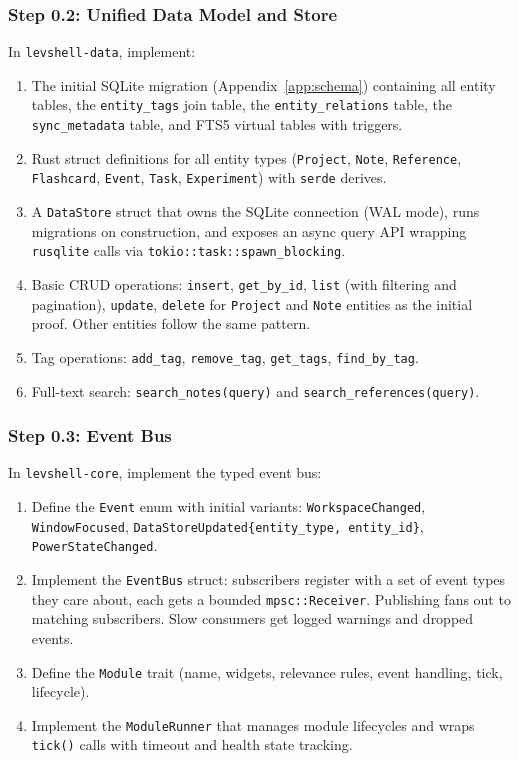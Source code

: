 \documentclass[11pt,a4paper]{article}
\begin{document}
\subsubsection{Step 0.2: Unified Data Model and Store}

In \texttt{levshell-data}, implement:

\begin{enumerate}[leftmargin=1.5em, itemsep=2pt]
  \item The initial SQLite migration (Appendix~\ref{app:schema}) containing all entity tables, the \texttt{entity\_tags} join table, the \texttt{entity\_relations} table, the \texttt{sync\_metadata} table, and FTS5 virtual tables with triggers.
  \item Rust struct definitions for all entity types (\texttt{Project}, \texttt{Note}, \texttt{Reference}, \texttt{Flashcard}, \texttt{Event}, \texttt{Task}, \texttt{Experiment}) with \texttt{serde} derives.
  \item A \texttt{DataStore} struct that owns the SQLite connection (WAL mode), runs migrations on construction, and exposes an async query API wrapping \texttt{rusqlite} calls via \texttt{tokio::task::spawn\_blocking}.
  \item Basic CRUD operations: \texttt{insert}, \texttt{get\_by\_id}, \texttt{list} (with filtering and pagination), \texttt{update}, \texttt{delete} for \texttt{Project} and \texttt{Note} entities as the initial proof. Other entities follow the same pattern.
  \item Tag operations: \texttt{add\_tag}, \texttt{remove\_tag}, \texttt{get\_tags}, \texttt{find\_by\_tag}.
  \item Full-text search: \texttt{search\_notes(query)} and \texttt{search\_references(query)}.
\end{enumerate}

\subsubsection{Step 0.3: Event Bus}

In \texttt{levshell-core}, implement the typed event bus:

\begin{enumerate}[leftmargin=1.5em, itemsep=2pt]
  \item Define the \texttt{Event} enum with initial variants: \texttt{WorkspaceChanged}, \texttt{WindowFocused}, \texttt{DataStoreUpdated\{entity\_type, entity\_id\}}, \texttt{PowerStateChanged}.
  \item Implement the \texttt{EventBus} struct: subscribers register with a set of event types they care about, each gets a bounded \texttt{mpsc::Receiver}. Publishing fans out to matching subscribers. Slow consumers get logged warnings and dropped events.
  \item Define the \texttt{Module} trait (name, widgets, relevance rules, event handling, tick, lifecycle).
  \item Implement the \texttt{ModuleRunner} that manages module lifecycles and wraps \texttt{tick()} calls with timeout and health state tracking.
\end{enumerate}
\end{document}
